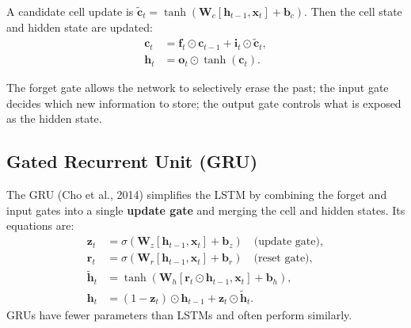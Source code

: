 \documentclass{tufte-handout}
\begin{document}
A candidate cell update is $\tilde{\mathbf{c}}_t = \tanh(\mathbf{W}_c [\mathbf{h}_{t-1}, \mathbf{x}_t] + \mathbf{b}_c)$. Then the cell state and hidden state are updated:
\begin{align}
    \mathbf{c}_t &= \mathbf{f}_t \odot \mathbf{c}_{t-1} + \mathbf{i}_t \odot \tilde{\mathbf{c}}_t, \\
    \mathbf{h}_t &= \mathbf{o}_t \odot \tanh(\mathbf{c}_t).
\end{align}

The forget gate allows the network to selectively erase the past; the input gate decides which new information to store; the output gate controls what is exposed as the hidden state.

\subsection{Gated Recurrent Unit (GRU)}

The GRU (Cho et al., 2014) simplifies the LSTM by combining the forget and input gates into a single \textbf{update gate} and merging the cell and hidden states. Its equations are:
\begin{align}
    \mathbf{z}_t &= \sigma(\mathbf{W}_z [\mathbf{h}_{t-1}, \mathbf{x}_t] + \mathbf{b}_z) \quad \text{(update gate)}, \\
    \mathbf{r}_t &= \sigma(\mathbf{W}_r [\mathbf{h}_{t-1}, \mathbf{x}_t] + \mathbf{b}_r) \quad \text{(reset gate)}, \\
    \tilde{\mathbf{h}}_t &= \tanh(\mathbf{W}_h [\mathbf{r}_t \odot \mathbf{h}_{t-1}, \mathbf{x}_t] + \mathbf{b}_h), \\
    \mathbf{h}_t &= (1 - \mathbf{z}_t) \odot \mathbf{h}_{t-1} + \mathbf{z}_t \odot \tilde{\mathbf{h}}_t.
\end{align}
GRUs have fewer parameters than LSTMs and often perform similarly.

\begin{marginfigure}
\centering
{}
\caption{Schematic of an LSTM cell. The cell state $\mathbf{c}_t$ (not shown separately) flows through the top, modulated by gates.}
\end{marginfigure}
\end{document}
